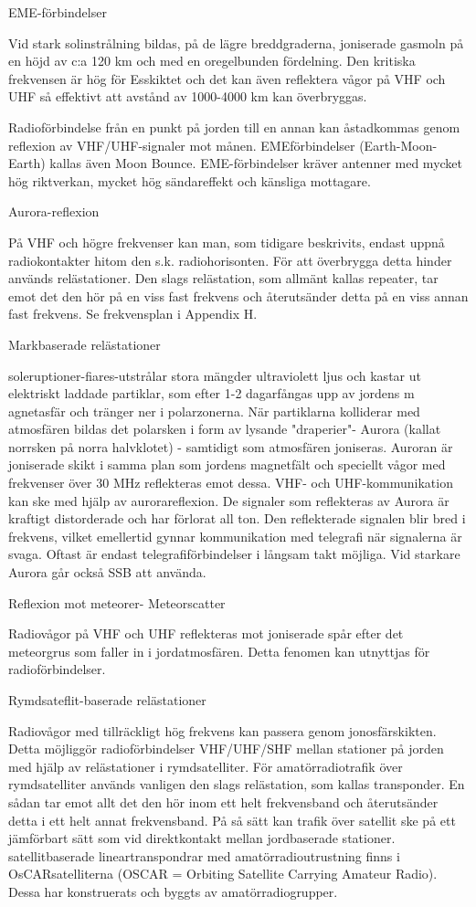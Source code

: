 \documentclass[a4paper,twoside,twocolumn,openright]{book}
\begin{document}
{{{{{EME-förbindelser

Vid stark solinstrålning bildas, på de lägre
breddgraderna, joniserade gasmoln på en
höjd av c:a 120 km och med en oregelbunden fördelning.
Den kritiska frekvensen är hög för Esskiktet och det kan även reflektera vågor på
VHF och UHF så effektivt att avstånd av
1000-4000 km kan överbryggas.

Radioförbindelse från en punkt på jorden till
en annan kan åstadkommas genom reflexion av VHF/UHF-signaler mot månen. EMEförbindelser (Earth-Moon-Earth) kallas även
Moon Bounce. EME-förbindelser kräver antenner med mycket hög riktverkan, mycket
hög sändareffekt och känsliga mottagare.

Aurora-reflexion

På VHF och högre frekvenser kan man, som
tidigare beskrivits, endast uppnå radiokontakter hitom den s.k. radiohorisonten.
För att överbrygga detta hinder används
relästationer. Den slags relästation, som allmänt kallas repeater, tar emot det den hör på
en viss fast frekvens och återutsänder detta
på en viss annan fast frekvens. Se frekvensplan i Appendix H.

Markbaserade relästationer

soleruptioner-fiares-utstrålar stora mängder ultraviolett ljus och kastar ut elektriskt
laddade partiklar, som efter 1-2 dagarfångas
upp av jordens m agnetasfär och tränger ner
i polarzonerna. När partiklarna kolliderar med
atmosfären bildas det polarsken i form av
lysande "draperier"- Aurora (kallat norrsken
på norra halvklotet) - samtidigt som atmosfären joniseras. Auroran är joniserade skikt
i samma plan som jordens magnetfält och
speciellt vågor med frekvenser över 30 MHz
reflekteras emot dessa.
VHF- och UHF-kommunikation kan ske
med hjälp av aurorareflexion. De signaler
som reflekteras av Aurora är kraftigt distorderade och har förlorat all ton. Den reflekterade signalen blir bred i frekvens, vilket emellertid gynnar kommunikation med telegrafi
när signalerna är svaga. Oftast är endast
telegrafiförbindelser i långsam takt möjliga.
Vid starkare Aurora går också SSB att använda.

Reflexion mot meteorer- Meteorscatter

Radiovågor på VHF och UHF reflekteras
mot joniserade spår efter det meteorgrus
som faller in i jordatmosfären. Detta fenomen kan utnyttjas för radioförbindelser.

Rymdsateflit-baserade relästationer

Radiovågor med tillräckligt hög frekvens kan
passera genom jonosfärskikten. Detta möjliggör radioförbindelser
VHF/UHF/SHF
mellan stationer på jorden med hjälp av relästationer i rymdsatelliter.
För amatörradiotrafik över rymdsatelliter
används vanligen den slags relästation, som
kallas transponder. En sådan tar emot allt
det den hör inom ett helt frekvensband och
återutsänder detta i ett helt annat frekvensband. På så sätt kan trafik över satellit ske på
ett jämförbart sätt som vid direktkontakt mellan jordbaserade stationer.
satellitbaserade lineartranspondrar med
amatörradioutrustning finns i OsCARsatelliterna (OSCAR = Orbiting Satellite
Carrying Amateur Radio). Dessa har konstruerats och byggts av amatörradiogrupper.

}}}}}
\end{document}
